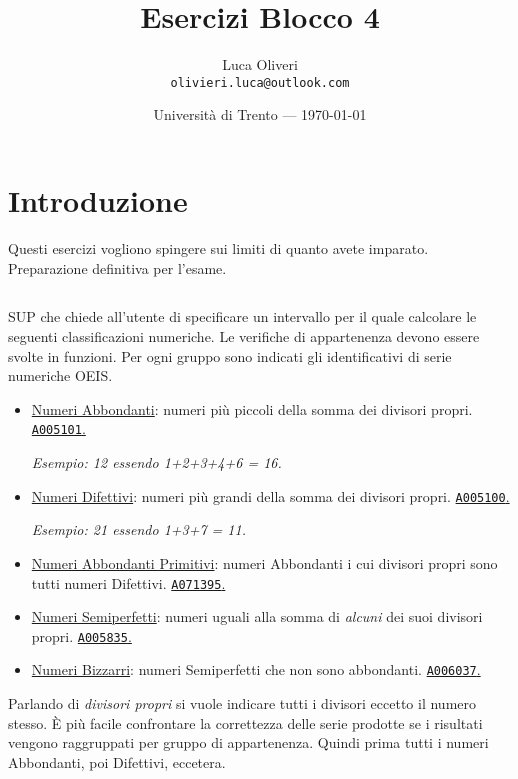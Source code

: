 \documentclass{article}
\title{Esercizi Blocco 4} %
\author{Luca Oliveri\\ \texttt{olivieri.luca@outlook.com}} %
\date{Università di Trento --- \today} %
\begin{document}
\maketitle %

\section*{Introduzione} %
Questi esercizi vogliono spingere sui limiti di quanto avete imparato. Preparazione definitiva per l'esame.

\setcounter{section}{4}

\subsection{}
SUP che chiede all'utente di specificare un intervallo per il quale calcolare le seguenti classificazioni numeriche. Le verifiche di appartenenza devono essere svolte in funzioni. Per ogni gruppo sono indicati gli identificativi di serie numeriche OEIS.
\begin{itemize}
	\item \href{https://en.wikipedia.org/wiki/Abundant_number}{Numeri Abbondanti}: numeri più piccoli della somma dei divisori propri. \href{https://oeis.org/A005101}{\texttt{A005101}.}
	
	\textit{Esempio: 12 essendo 1+2+3+4+6 = 16.}
	\item \href{https://en.wikipedia.org/wiki/Deficient_number}{Numeri Difettivi}: numeri più grandi della somma dei divisori propri. \href{https://oeis.org/A005100}{\texttt{A005100}.}
	
	\textit{Esempio: 21 essendo 1+3+7 = 11. }
	\item \href{https://en.wikipedia.org/wiki/Primitive_abundant_number}{Numeri Abbondanti Primitivi}: numeri Abbondanti i cui divisori propri sono tutti numeri Difettivi. \href{https://oeis.org/A071395}{\texttt{A071395}.}
	\item \href{https://en.wikipedia.org/wiki/Semiperfect_number}{Numeri Semiperfetti}: numeri uguali alla somma di \textit{alcuni} dei suoi divisori propri.
	\href{https://oeis.org/A005835}{\texttt{A005835}.}
	\item \href{https://en.wikipedia.org/wiki/Weird_number}{Numeri Bizzarri}: numeri Semiperfetti che non sono abbondanti. 
	\href{https://oeis.org/A006037}{\texttt{A006037}.}
\end{itemize}

\begin{info}
	Parlando di \textit{divisori propri} si vuole indicare tutti i divisori eccetto il numero stesso. È più facile confrontare la correttezza delle serie prodotte se i risultati vengono raggruppati per gruppo di appartenenza. Quindi prima tutti i numeri Abbondanti, poi Difettivi, eccetera.
\end{info}
\end{document}
